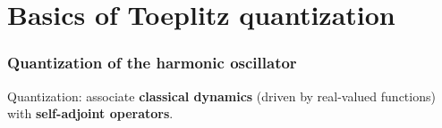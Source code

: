 \documentclass[mathserif]{beamer}
\begin{document}
\section{Basics of Toeplitz quantization}
\begin{frame}
  \frametitle{Quantization of the harmonic oscillator}
  Quantization: associate {\bf classical dynamics} (driven by
  real-valued functions) with {\bf self-adjoint operators}.

\end{frame}
\end{document}
